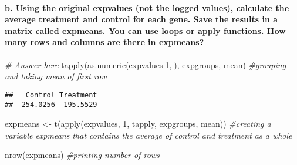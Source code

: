 \documentclass[
]{article}
\newenvironment{Shaded}{\begin{snugshade}}{\end{snugshade}}
\newcommand{\CommentTok}[1]{\textcolor[rgb]{0.56,0.35,0.01}{\textit{#1}}}
\newcommand{\DecValTok}[1]{\textcolor[rgb]{0.00,0.00,0.81}{#1}}
\newcommand{\FunctionTok}[1]{\textcolor[rgb]{0.00,0.00,0.00}{#1}}
\newcommand{\NormalTok}[1]{#1}
\newcommand{\OtherTok}[1]{\textcolor[rgb]{0.56,0.35,0.01}{#1}}
\begin{document}
\hypertarget{b.-using-the-original-expvalues-not-the-logged-values-calculate-the-average-treatment-and-control-for-each-gene.-save-the-results-in-a-matrix-called-expmeans.-you-can-use-loops-or-apply-functions.-how-many-rows-and-columns-are-there-in-expmeans}{%
\paragraph{\texorpdfstring{b. Using the original expvalues (not the
logged values), calculate the average \textbf{treatment} and
\textbf{control} for each gene. Save the results in a matrix called
\textbf{expmeans}. You can use loops or apply functions. How many rows
and columns are there in
expmeans?}{b. Using the original expvalues (not the logged values), calculate the average treatment and control for each gene. Save the results in a matrix called expmeans. You can use loops or apply functions. How many rows and columns are there in expmeans?}}\label{b.-using-the-original-expvalues-not-the-logged-values-calculate-the-average-treatment-and-control-for-each-gene.-save-the-results-in-a-matrix-called-expmeans.-you-can-use-loops-or-apply-functions.-how-many-rows-and-columns-are-there-in-expmeans}}

\begin{Shaded}
\begin{Highlighting}[]
\CommentTok{\# Answer here}
\FunctionTok{tapply}\NormalTok{(}\FunctionTok{as.numeric}\NormalTok{(expvalues[}\DecValTok{1}\NormalTok{,]), expgroups, mean) }\CommentTok{\#grouping and taking mean of first row}
\end{Highlighting}
\end{Shaded}

\begin{verbatim}
##   Control Treatment 
##  254.0256  195.5529
\end{verbatim}

\begin{Shaded}
\begin{Highlighting}[]
\NormalTok{expmeans }\OtherTok{\textless{}{-}} \FunctionTok{t}\NormalTok{(}\FunctionTok{apply}\NormalTok{(expvalues, }\DecValTok{1}\NormalTok{, tapply, expgroups, mean)) }\CommentTok{\#creating a variable expmeans that contains the average of control and treatment as a whole}

\FunctionTok{nrow}\NormalTok{(expmeans) }\CommentTok{\#printing number of rows}
\end{Highlighting}
\end{Shaded}
\end{document}
